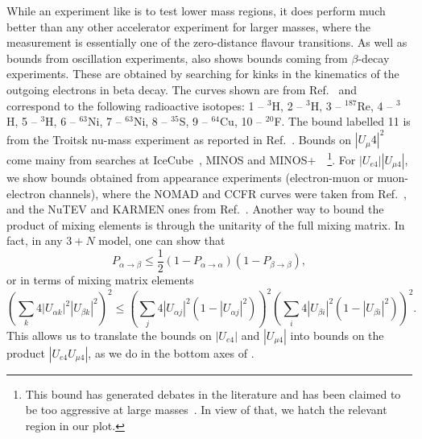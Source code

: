 While an experiment like \nus is to test lower mass regions, it does perform much better than any other accelerator experiment for larger masses, where the measurement is essentially one of the zero-distance flavour transitions. As well as bounds from oscillation experiments,  also shows bounds coming from $\beta$-decay experiments. These are obtained by searching for kinks in the kinematics of the outgoing electrons in beta decay. The curves shown are from Ref.~\cite{Dragoun2015} and correspond to the following radioactive isotopes: 1 -- $^3$H, 2 -- $^3$H, 3 -- $^{187}$Re, 4 -- $^3$H, 5 -- $^3$H, 6 -- $^{63}$Ni, 7 -- $^{63}$Ni, 8 -- $^{35}$S, 9 -- $^{64}$Cu, 10 -- $^{20}$F. The bound labelled 11 is from the Troitsk nu-mass experiment as reported in Ref.~\cite{Abdurashitov:2017kka}. Bounds on $|U_\mu4|^2$ come mainy from searches at IceCube~\cite{TheIceCubeCollaboration2016}, MINOS and MINOS+~\cite{Adamson:2017uda}~\footnote{This bound has generated debates in the literature and has been claimed to be too aggressive at large masses~\cite{Louis:2018yeg,Diaz:2019fwt}. In view of that, we hatch the relevant region in our plot.}. For $|U_{e4}||U_{\mu4}|$, we show bounds obtained from appearance experiments (electron-muon or muon-electron channels), where the NOMAD and CCFR curves were taken from Ref.~\cite{Astier2003}, and the NuTEV and KARMEN ones from Ref.~\cite{Avvakumov2002}.
%
Another way to bound the product of mixing elements is through the unitarity of the full mixing matrix. In fact, in any $3+N$ model, one can show that 
\begin{equation}
 P_{\alpha \to \beta} \leq \frac{1}{2} (1 - P_{\alpha \to \alpha})(1 - P_{\beta \to \beta}),
\end{equation}
or in terms of mixing matrix elements
\begin{equation}
\left( \sum_k 4 |U_{\alpha k}|^2|U_{\beta k}|^2 \right)^2 \leq \left( \sum_j 4 |U_{\alpha j}|^2( 1- |U_{\alpha j}|^2) \right)^2 \left( \sum_i 4 |U_{\beta i}|^2(1 - |U_{\beta i}|^2) \right)^2.
\end{equation}
This allows us to translate the bounds on $|U_{e 4}|$ and $|U_{\mu 4}|$ into bounds on the product $|U_{e 4} U_{\mu 4}|$, as we do in the bottom axes of .

